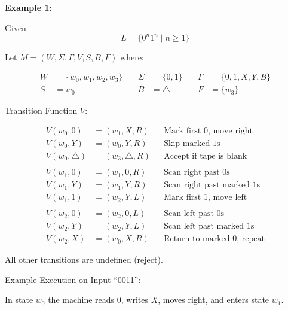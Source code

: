 \documentclass[12pt,a4paper,openany]{article}
\begin{document}
\textbf{Example 1}:

Given  \[L = \{0^n1^n \mid n \geq 1\}\]

Let $M = (W, \Sigma, \Gamma, V, S, B, F)$ where:

\[
\begin{aligned}
W &= \{w_0, w_1, w_2, w_3\} & \quad
\Sigma &= \{0, 1\} & \quad
\Gamma &= \{0, 1, X, Y, B\} \\[6pt]
S &= w_0 & \quad
B &= \triangle & \quad
F &= \{w_3\}
\end{aligned}
\]

Transition Function $V$:

\begin{align*}
V(w_0, 0) &= (w_1, X, R) && \text{Mark first 0, move right} \\
V(w_0, Y) &= (w_0, Y, R) && \text{Skip marked 1s} \\
V(w_0, \triangle ) &= (w_3, \triangle , R) && \text{Accept if tape is blank} \\
\\
V(w_1, 0) &= (w_1, 0, R) && \text{Scan right past 0s} \\
V(w_1, Y) &= (w_1, Y, R) && \text{Scan right past marked 1s} \\
V(w_1, 1) &= (w_2, Y, L) && \text{Mark first 1, move left} \\
\\
V(w_2, 0) &= (w_2, 0, L) && \text{Scan left past 0s} \\
V(w_2, Y) &= (w_2, Y, L) && \text{Scan left past marked 1s} \\
V(w_2, X) &= (w_0, X, R) && \text{Return to marked 0, repeat}
\end{align*}

All other transitions are undefined (reject).

Example Execution on Input ``0011'':

\noindent
In state $w_0$ the machine reads $0$, writes $X$, moves right, and enters state $w_1$.

\begin{center}
\end{center}
\end{document}
